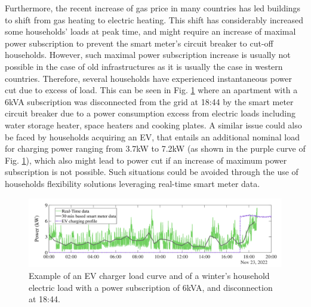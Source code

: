 \documentclass[conference]{IEEEtran}
\begin{document}
Furthermore, the recent increase of gas price in many countries has led buildings to shift from gas heating to electric heating. This shift has considerably increased some households' loads at peak time, and might require an increase of maximal power subscription to prevent the smart meter's circuit breaker to cut-off households. However, such maximal power subscription increase  is usually not  possible in the case of old infrastructures as it is usually the case in western countries. Therefore, several households have experienced instantaneous power cut due to excess of load. This can be seen in Fig. \ref{Fig:load_example} where an apartment with a 6kVA subscription was disconnected from the grid at 18:44 by the smart meter circuit breaker due to a power consumption excess from electric loads including water storage heater, space heaters and cooking plates. A similar issue could also be faced by households acquiring an EV, that entails an additional nominal load for charging power ranging from 3.7kW to 7.2kW (as shown in the purple curve of Fig. \ref{Fig:load_example}), which also might lead to power cut if an increase of maximum power subscription is not possible. Such situations could be avoided through the use of households flexibility solutions leveraging real-time smart meter data. 

\begin{figure}[h]
	\centering
	\includegraphics[width=1\columnwidth]{Images/load_curvesEV.pdf}
	\caption{Example of an EV charger load curve and of a winter's household electric load with a power subscription of 6kVA, and disconnection at 18:44.} %
	\label{Fig:load_example}
\end{figure}
\end{document}
